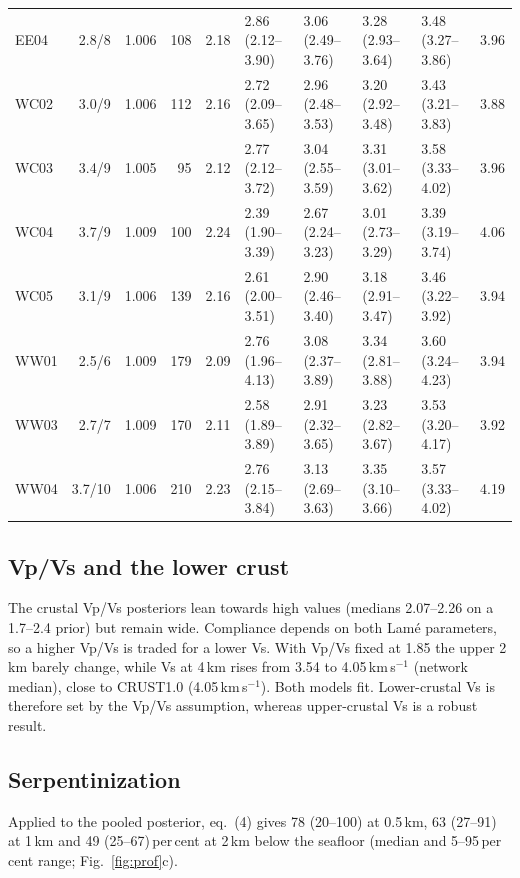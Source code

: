 \documentclass[10pt,a4paper,twocolumn]{article}
\begin{document}
\begin{table}
{\begin{tabular}{lrrrrllllr}
EE04 & 2.8/8 & 1.006 & 108 & 2.18 & 2.86 (2.12--3.90) & 3.06 (2.49--3.76) & 3.28 (2.93--3.64) & 3.48 (3.27--3.86) & 3.96 \\
WC02 & 3.0/9 & 1.006 & 112 & 2.16 & 2.72 (2.09--3.65) & 2.96 (2.48--3.53) & 3.20 (2.92--3.48) & 3.43 (3.21--3.83) & 3.88 \\
WC03 & 3.4/9 & 1.005 & 95 & 2.12 & 2.77 (2.12--3.72) & 3.04 (2.55--3.59) & 3.31 (3.01--3.62) & 3.58 (3.33--4.02) & 3.96 \\
WC04 & 3.7/9 & 1.009 & 100 & 2.24 & 2.39 (1.90--3.39) & 2.67 (2.24--3.23) & 3.01 (2.73--3.29) & 3.39 (3.19--3.74) & 4.06 \\
WC05 & 3.1/9 & 1.006 & 139 & 2.16 & 2.61 (2.00--3.51) & 2.90 (2.46--3.40) & 3.18 (2.91--3.47) & 3.46 (3.22--3.92) & 3.94 \\
WW01 & 2.5/6 & 1.009 & 179 & 2.09 & 2.76 (1.96--4.13) & 3.08 (2.37--3.89) & 3.34 (2.81--3.88) & 3.60 (3.24--4.23) & 3.94 \\
WW03 & 2.7/7 & 1.009 & 170 & 2.11 & 2.58 (1.89--3.89) & 2.91 (2.32--3.65) & 3.23 (2.82--3.67) & 3.53 (3.20--4.17) & 3.92 \\
WW04 & 3.7/10 & 1.006 & 210 & 2.23 & 2.76 (2.15--3.84) & 3.13 (2.69--3.63) & 3.35 (3.10--3.66) & 3.57 (3.33--4.02) & 4.19 \\
\bottomrule
\end{tabular}}
\end{table}

\subsection{Vp/Vs and the lower crust}
The crustal Vp/Vs posteriors lean towards high values (medians 2.07--2.26 on a 1.7--2.4 prior) but remain wide.
Compliance depends on both Lam\'e parameters, so a higher Vp/Vs is traded for a lower Vs. With Vp/Vs fixed at 1.85 the
upper 2\,km barely change, while Vs at 4\,km rises from 3.54 to 4.05\,km\,s$^{-1}$ (network median), close to
CRUST1.0 (4.05\,km\,s$^{-1}$). Both models fit. Lower-crustal Vs is therefore set by the Vp/Vs assumption,
whereas upper-crustal Vs is a robust result.

\subsection{Serpentinization}
Applied to the pooled posterior, eq.~(4) gives 78 (20--100) at 0.5\,km, 63 (27--91) at 1\,km and 49 (25--67)\,per\,cent at
2\,km below the seafloor (median and 5--95\,per\,cent range; Fig.~\ref{fig:prof}c).
\end{document}
